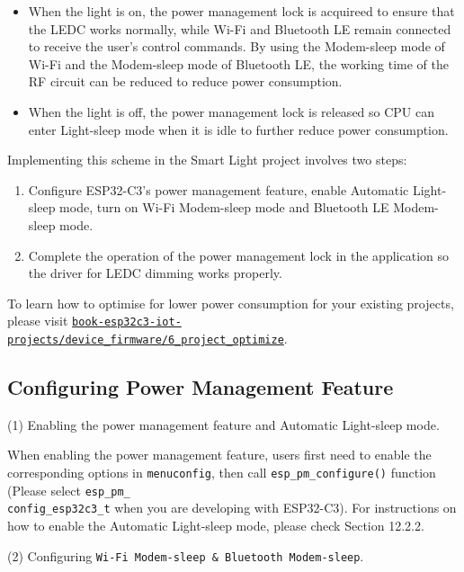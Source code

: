 \documentclass[a4paper,12pt]{book}
\begin{document}
\begin{itemize}[leftmargin=1.5em]
    \item When the light is on, the power management lock is acquireed to ensure that the LEDC works normally, while Wi-Fi and Bluetooth LE remain connected to receive the user's control commands. By using the Modem-sleep mode of Wi-Fi and the Modem-sleep mode of Bluetooth LE, the working time of the RF circuit can be reduced to reduce power consumption.
    \item When the light is off, the power management lock is released so CPU can enter Light-sleep mode when it is idle to further reduce power consumption.
\end{itemize}

Implementing this scheme in the Smart Light project involves two steps:

\begin{enumerate}[label=(\arabic*)]
    \item Configure ESP32-C3’s power management feature, enable Automatic Light-sleep mode, turn on Wi-Fi Modem-sleep mode and Bluetooth LE Modem-sleep mode.
    \item Complete the operation of the power management lock in the application so the driver for LEDC dimming works properly.
\end{enumerate}

To learn how to optimise for lower power consumption for your existing projects, please visit \href{https://github.com/espressif/book-esp32c3-iot-projects/tree/main/device_firmware/6_project_optimize}{\texttt{book-esp32c3-iot-projects/device\_firmware/6\_project\_optimize}}.

\subsection{Configuring Power Management Feature}
(1) Enabling the power management feature and Automatic Light-sleep mode.

When enabling the power management feature, users first need to enable the corresponding options in \verb|menuconfig|, then call \verb|esp_pm_configure()| function (Please select \verb|esp_pm_|\\ \verb|config_esp32c3_t| when you are developing with ESP32-C3). For instructions on how to enable the Automatic Light-sleep mode, please check Section 12.2.2.

(2) Configuring \verb|Wi-Fi Modem-sleep & Bluetooth Modem-sleep|.
\end{document}
